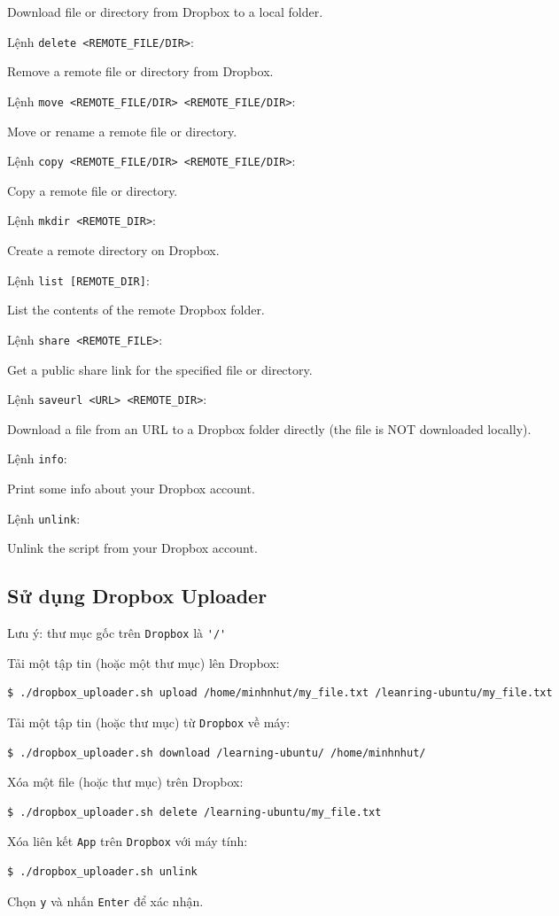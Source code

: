 \begin{list}{--}{}
\begin{list}{+}{}
Download file or directory from Dropbox to a local folder.
\item Lệnh \verb|delete <REMOTE_FILE/DIR>|:

Remove a remote file or directory from Dropbox. 
\item Lệnh \verb|move <REMOTE_FILE/DIR> <REMOTE_FILE/DIR>|:

Move or rename a remote file or directory.
\item Lệnh \verb|copy <REMOTE_FILE/DIR> <REMOTE_FILE/DIR>|:

Copy a remote file or directory.
\item Lệnh \verb|mkdir <REMOTE_DIR>|:

Create a remote directory on Dropbox.
\item Lệnh \verb|list [REMOTE_DIR]|:

List the contents of the remote Dropbox folder.
\item Lệnh \verb|share <REMOTE_FILE>|:

Get a public share link for the specified file or directory.
\item Lệnh \verb|saveurl <URL> <REMOTE_DIR>|:

Download a file from an URL to a Dropbox folder directly (the file is NOT downloaded locally).
\item Lệnh \verb|info|:

Print some info about your Dropbox account.
\item Lệnh \verb|unlink|:

Unlink the script from your Dropbox account.
\end{list}
\end{list}
\subsection{Sử dụng Dropbox Uploader}
Lưu ý: thư mục gốc trên \verb|Dropbox| là \verb|'/'|
\begin{list}{--}{}
\item Tải một tập tin (hoặc một thư mục) lên Dropbox:
\begin{lstlisting}[language=bash]
$ ./dropbox_uploader.sh upload /home/minhnhut/my_file.txt /leanring-ubuntu/my_file.txt
\end{lstlisting}
\item Tải một tập tin (hoặc thư mục) từ \verb|Dropbox| về máy: 
\begin{lstlisting}[language=bash]
$ ./dropbox_uploader.sh download /learning-ubuntu/ /home/minhnhut/
\end{lstlisting}
\item Xóa một file (hoặc thư mục) trên Dropbox:
\begin{lstlisting}[language=bash]
$ ./dropbox_uploader.sh delete /learning-ubuntu/my_file.txt
\end{lstlisting}
\item Xóa liên kết \verb|App| trên \verb|Dropbox| với máy tính:
\begin{lstlisting}[language=bash]
$ ./dropbox_uploader.sh unlink
\end{lstlisting}
Chọn \verb|y| và nhấn \verb|Enter| để xác nhận.
\end{list}